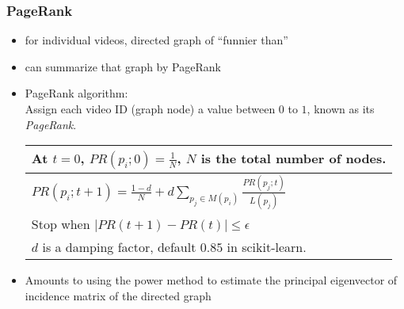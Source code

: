 \documentclass[fleqn]{beamer}
\begin{document}
\begin{frame}
\frametitle{PageRank}
      \begin{itemize}
         \item for individual videos, directed graph of ``funnier than''
         \item can summarize that graph by PageRank
         \item PageRank algorithm: \\
               Assign each video ID (graph node) a value
                between $0$ to $1$, known as its \textsl{PageRank}.
         \begin{center}
         \begin{tabular}{| l |}
         \hline
         At $t=0$, $PR(p_{i};0) = \frac{1}{N}$, $N$ is the total number of nodes. \\ \hline
         $PR(p_{i};t+1) = \frac{1-d}{N} + d \sum_{p_{j} \in M(p_{i})} \frac{PR(p_{j};t)}{L(p_{j})}$ \\ \hline
         Stop when $|PR(t+1) - PR(t)| \le \epsilon$ \\ \hline
         $d$ is a damping factor, default $0.85$ in scikit-learn. \\
         \hline
         \end{tabular}
         \end{center}
         \item Amounts to using the power method to estimate the principal 
                  eigenvector of incidence matrix of the directed graph
     \end{itemize}

\end{frame}
\end{document}
